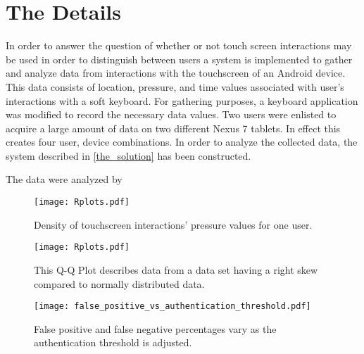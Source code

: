 \section{The Details}
\label{the_details}
In order to answer the question of
whether or not touch screen interactions may be used
in order to distinguish between users
a system is implemented to gather and analyze data
from interactions with the touchscreen of an Android device.
This data consists of location, pressure, and time
values associated with user's interactions with a soft keyboard.
%
For gathering purposes,
a keyboard application was modified to record
the necessary data values.
%
Two users were enlisted to acquire a large 
amount of data on two different Nexus 7 tablets.
In effect this creates four user, device combinations.
%
In order to analyze the collected data,
the system described in \ref{the_solution}
has been constructed.

The data were analyzed by 

\begin{figure}
\centering
\texttt{[image: Rplots.pdf]}
\caption{
Density of touchscreen interactions' pressure values for one user.
}
\label{fig:normal_distribution}
\end{figure}

\begin{figure}
\centering
\texttt{[image: Rplots.pdf]}
\caption{
This Q-Q Plot describes data from
a data set having a right skew compared to normally distributed data.
}
\label{fig:qq_plot}
\end{figure}

\begin{figure}
\centering
\texttt{[image: false\_positive\_vs\_authentication\_threshold.pdf]}
\caption{False positive and false negative percentages vary as the authentication threshold is adjusted.}
\label{fig:threshold_vs_percentages}
\end{figure}

